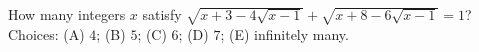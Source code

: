 How many integers $x$ satisfy $\sqrt{x+3-4\sqrt{x-1}}+\sqrt{x+8-6\sqrt{x-1}}=1$? Choices: (A) $4$; (B) $5$; (C) $6$; (D) $7$; (E) infinitely many.
